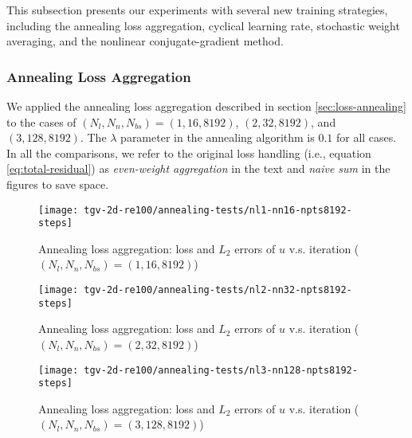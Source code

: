 This subsection presents our experiments with several new training strategies, including the annealing loss aggregation, cyclical learning rate, stochastic weight averaging, and the nonlinear conjugate-gradient method.

\subsubsection{Annealing Loss Aggregation}

We applied the annealing loss aggregation described in section \ref{sec:loss-annealing} to the cases of $(N_l, N_n, N_{bs}) = (1, 16, 8192)$, $(2, 32, 8192)$, and $(3, 128, 8192)$.
The $\lambda$ parameter in the annealing algorithm is $0.1$ for all cases.
In all the comparisons, we refer to the original loss handling (i.e., equation \eqref{eq:total-residual}) as {\it even-weight aggregation} in the text and {\it naive sum} in the figures to save space.

\begin{figure}[hbt!]
    \centering%
    \texttt{[image: tgv-2d-re100/annealing-tests/nl1-nn16-npts8192-steps]}%
    \caption[%
        Annealing loss aggregation: loss and $L_2$ errors of $u$ v.s. iteration ($(N_l, N_n, N_{bs})=(1, 16, 8192)$)%
    ]{%
        Annealing loss aggregation: loss and $L_2$ errors of $u$ v.s. iteration ($(N_l, N_n, N_{bs})=(1, 16, 8192)$)%
    }\label{fig:annealing-tests-nl1-nn16-npts8192-steps}%
\end{figure}

\begin{figure}[hbt!]
    \centering%
    \texttt{[image: tgv-2d-re100/annealing-tests/nl2-nn32-npts8192-steps]}%
    \caption[%
        Annealing loss aggregation: loss and $L_2$ errors of $u$ v.s. iteration ($(N_l, N_n, N_{bs})=(2, 32, 8192)$)%
    ]{%
        Annealing loss aggregation: loss and $L_2$ errors of $u$ v.s. iteration ($(N_l, N_n, N_{bs})=(2, 32, 8192)$)%
    }\label{fig:annealing-tests-nl2-nn32-npts8192-steps}%
\end{figure}

\begin{figure}[hbt!]
    \centering%
    \texttt{[image: tgv-2d-re100/annealing-tests/nl3-nn128-npts8192-steps]}%
    \caption[%
        Annealing loss aggregation: loss and $L_2$ errors of $u$ v.s. iteration ($(N_l, N_n, N_{bs})=(3, 128, 8192)$)%
    ]{%
        Annealing loss aggregation: loss and $L_2$ errors of $u$ v.s. iteration ($(N_l, N_n, N_{bs})=(3, 128, 8192)$)%
    }\label{fig:annealing-tests-nl3-nn128-npts8192-steps}%
\end{figure}

